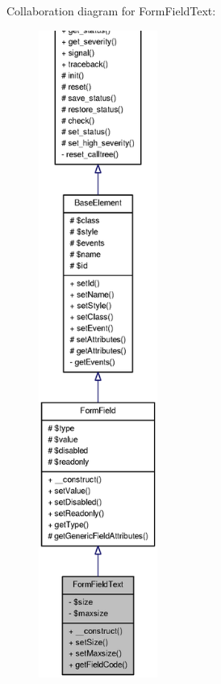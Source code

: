 Collaboration diagram for FormFieldText:\nopagebreak
\begin{figure}[H]
\begin{center}
\leavevmode
\includegraphics[height=600pt]{classFormFieldText__coll__graph}
\end{center}
\end{figure}
